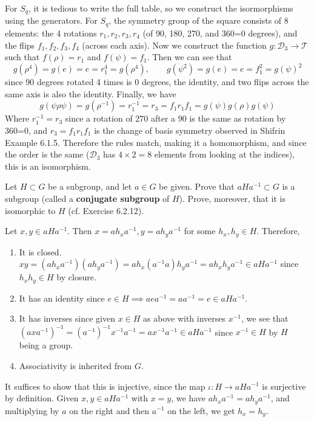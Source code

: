 \begin{solution}
    For $S_q$, it is tedious to write the full table, so we construct the isormorphisms using the generators. For $S_q$, the symmetry group of the square consists of 8 elements: the 4 rotations $r_1, r_2, r_3, r_4$ (of 90, 180, 270, and 360=0 degrees), and the flips $f_1, f_2, f_3, f_4$ (across each axis). Now we construct the function $g: \mathcal{D}_3 \rightarrow \mathcal{T}$ such that $f(\rho) = r_1$ and $f(\psi) = f_1$. Then we can see that 
    \begin{equation}
      g(\rho^4) = g(e) = e = r_1^4 = g(\rho^4), \qquad g(\psi^2) = g(e) = e = f_1^2 = g(\psi)^2
    \end{equation}
    since 90 degrees rotated 4 times is $0$ degrees, the identity, and two flips across the same axis is also the identity. Finally, we have 
    \begin{equation}
      g(\psi \rho \psi) = g(\rho^{-1}) = r_1^{-1} = r_3 = f_1 r_1 f_1 = g(\psi) g(\rho) g(\psi)
    \end{equation}
    Where $r_1^{-1} = r_3$ since a rotation of 270 after a 90 is the same as rotation by 360=0, and $r_3 = f_1 r_1 f_1$ is the change of basis symmetry observed in Shifrin Example 6.1.5. Therefore the rules match, making it a homomorphism, and since the order is the same ($\mathcal{D}_3$ has $4 \times 2 = 8$ elements from looking at the indices), this is an isomorphism. 
  \end{solution}

  \begin{exercise}[Shifrin 6.3.8]
    Let $H \subset G$ be a subgroup, and let $a \in G$ be given. Prove that $aHa^{-1} \subset G$ is a subgroup (called a \textbf{conjugate subgroup} of $H$). Prove, moreover, that it is isomorphic to $H$ (cf. Exercise 6.2.12).
  \end{exercise}
  \begin{solution}
    Let $x, y \in aHa^{-1}$. Then $x = a h_x a^{-1}, y = a h_y a^{-1}$ for some $h_x, h_y \in H$. Therefore, 
    \begin{enumerate}
      \item It is closed. $xy = (a h_x a^{-1}) (a h_y a^{-1}) = a h_x (a^{-1} a) h_y a^{-1} = a h_x h_y a^{-1} \in aHa^{-1}$ since $h_x h_y \in H$ by closure. 
      \item It has an identity since $e \in H \implies a e a^{-1} = a a^{-1} = e \in aHa^{-1}$. 
      \item It has inverses since given $x \in H$ as above with inverses $x^{-1}$, we see that $(a x a^{-1})^{-1} = (a^{-1})^{-1} x^{-1} a^{-1} = a x^{-1} a^{-1} \in a H a^{-1}$ since $x^{-1} \in H$ by $H$ being a group. 
      \item Associativity is inherited from $G$. 
    \end{enumerate} 
    It suffices to show that this is injective, since the map $\iota : H \rightarrow a H a^{-1}$ is surjective by definition. Given $x, y \in a H a^{-1}$ with $x = y$, we have $a h_x a^{-1} = a h_y a^{-1}$, and multiplying by $a$ on the right and then $a^{-1}$ on the left, we get $h_x = h_y$.
  \end{solution}

